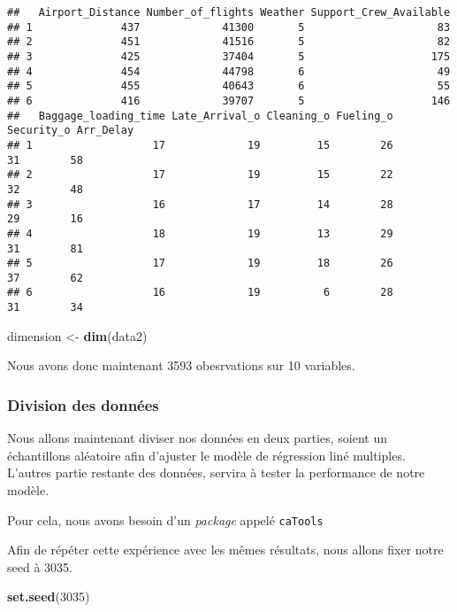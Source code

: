 \documentclass[
]{article}
\newenvironment{Shaded}{\begin{snugshade}}{\end{snugshade}}
\newcommand{\DecValTok}[1]{\textcolor[rgb]{0.00,0.00,0.81}{#1}}
\newcommand{\FunctionTok}[1]{\textcolor[rgb]{0.13,0.29,0.53}{\textbf{#1}}}
\newcommand{\NormalTok}[1]{#1}
\newcommand{\OtherTok}[1]{\textcolor[rgb]{0.56,0.35,0.01}{#1}}
\begin{document}
\begin{verbatim}
##   Airport_Distance Number_of_flights Weather Support_Crew_Available
## 1              437             41300       5                     83
## 2              451             41516       5                     82
## 3              425             37404       5                    175
## 4              454             44798       6                     49
## 5              455             40643       6                     55
## 6              416             39707       5                    146
##   Baggage_loading_time Late_Arrival_o Cleaning_o Fueling_o Security_o Arr_Delay
## 1                   17             19         15        26         31        58
## 2                   17             19         15        22         32        48
## 3                   16             17         14        28         29        16
## 4                   18             19         13        29         31        81
## 5                   17             19         18        26         37        62
## 6                   16             19          6        28         31        34
\end{verbatim}

\begin{Shaded}
\begin{Highlighting}[]
\NormalTok{dimension }\OtherTok{\textless{}{-}} \FunctionTok{dim}\NormalTok{(data2)}
\end{Highlighting}
\end{Shaded}

Nous avons donc maintenant 3593 obesrvations sur 10 variables.

\hypertarget{division-des-donnuxe9es}{%
\subsubsection{Division des données}\label{division-des-donnuxe9es}}

Nous allons maintenant diviser nos données en deux parties, soient un
échantillons aléatoire afin d'ajuster le modèle de régression liné
multiples. L'autres partie restante des données, servira à tester la
performance de notre modèle.

Pour cela, nous avons besoin d'un \emph{package} appelé \texttt{caTools}

Afin de répéter cette expérience avec les mêmes résultats, nous allons
fixer notre seed à 3035.

\begin{Shaded}
\begin{Highlighting}[]
\FunctionTok{set.seed}\NormalTok{(}\DecValTok{3035}\NormalTok{)}
\end{Highlighting}
\end{Shaded}
\end{document}
